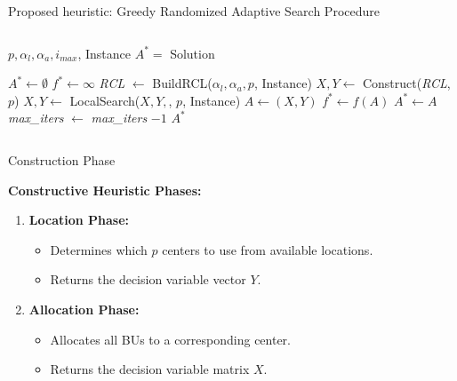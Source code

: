 \documentclass{beamer}
\begin{document}
\begin{frame}{Proposed heuristic: Greedy Randomized Adaptive Search Procedure}
    \begin{columns}
        \begin{algorithmic}[1]

        \REQUIRE $p, \alpha_l, \alpha_a, i_{max}$, Instance
        \ENSURE $A^* =$ Solution
        
        \STATE $A^* \gets \emptyset$
        \STATE $f^* \gets \infty$
            \STATE \textit{RCL} $\gets$ BuildRCL($\alpha_l, \alpha_a, p$, Instance)
            \STATE $X, Y \gets$ Construct(\textit{RCL}, $p$)
            \STATE $X, Y \gets$ LocalSearch($X, Y,$, $p$, Instance)
            \STATE $A \gets (X, Y)$
                \STATE $f^* \gets f(A)$
                \STATE $A^* \gets A$ 
            \ENDIF
            \STATE \textit{max\_iters} $\gets $ \textit{max\_iters} $- 1$
        \ENDWHILE
        \RETURN $A^*$
        
        \end{algorithmic}
    \end{columns}
\end{frame}

\begin{frame}{Construction Phase}
    
    \textbf{Constructive Heuristic Phases:}
    \begin{enumerate}
        \item \textbf{Location Phase:}
        \begin{itemize}
            \item Determines which $p$ centers to use from available locations.
            \item Returns the decision variable vector $Y$.
        \end{itemize}
        
        \item \textbf{Allocation Phase:}
        \begin{itemize}
            \item Allocates all BUs to a corresponding center.
            \item Returns the decision variable matrix $X$.
        \end{itemize}
    \end{enumerate}

\end{frame}
\end{document}
